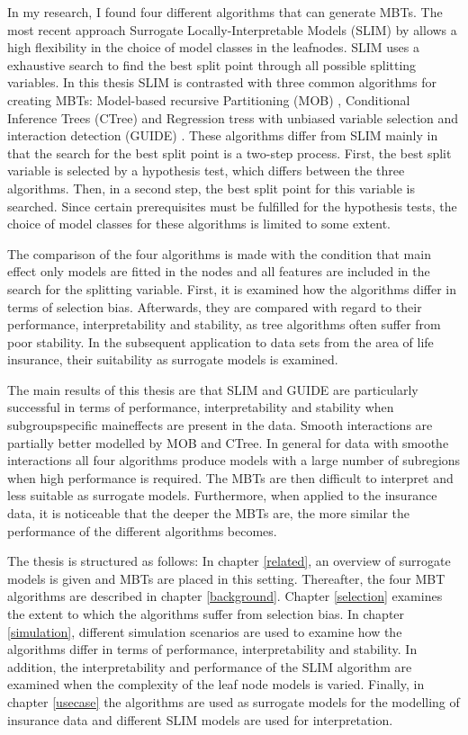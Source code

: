 In my research, I found four different algorithms that can generate MBTs. 
The most recent approach Surrogate Locally-Interpretable Models (SLIM) by \cite{Hu.2020} allows a high flexibility in the choice of model classes in the leafnodes. SLIM uses a exhaustive search to find the best split point through all possible splitting variables. 
In this thesis SLIM is contrasted with three common algorithms for creating MBTs: Model-based recursive Partitioning (MOB) \citep{Zeileis.2008}, Conditional Inference Trees (CTree) \citep{Hothorn.2006} and Regression tress with unbiased variable selection and interaction detection (GUIDE) \citep{Loh.2002}. These algorithms differ from SLIM mainly in that the search for the best split point is a two-step process. First, the best split variable is selected by a hypothesis test, which differs between the three algorithms. Then, in a second step, the best split point for this variable is searched. Since certain prerequisites must be fulfilled for the hypothesis tests, the choice of model classes for these algorithms is limited to some extent. 

The comparison of the four algorithms is made with the condition that main effect only models are fitted in the nodes and all features are included in the search for the splitting variable. First, it is examined how the algorithms differ in terms of selection bias. Afterwards, they are compared with regard to their performance, interpretability and stability, as tree algorithms often suffer from poor stability. In the subsequent application to data sets from the area of life insurance, their suitability as surrogate models is examined.

The main results of this thesis are that SLIM and GUIDE are particularly successful in terms of performance, interpretability and stability when subgroupspecific maineffects are present in the data. Smooth interactions are partially better modelled by MOB and CTree. In general for data with smoothe interactions all four algorithms produce models with a large number of subregions when high performance is required. The MBTs are then difficult to interpret and less suitable as surrogate models. Furthermore, when applied to the insurance data, it is noticeable that the deeper the MBTs are, the more similar the performance of the different algorithms becomes.

The thesis is structured as follows:
In chapter \ref{related}, an overview of surrogate models is given and MBTs are placed in this setting. Thereafter, the four MBT algorithms are described in chapter \ref{background}. Chapter \ref{selection} examines the extent to which the algorithms suffer from selection bias. In chapter \ref{simulation}, different simulation scenarios are used to examine how the algorithms differ in terms of performance, interpretability and stability. In addition, the interpretability and performance of the SLIM algorithm are examined when the complexity of the leaf node models is varied. Finally, in chapter \ref{usecase} the algorithms are used as surrogate models for the modelling of insurance data and different SLIM models are used for interpretation. 

